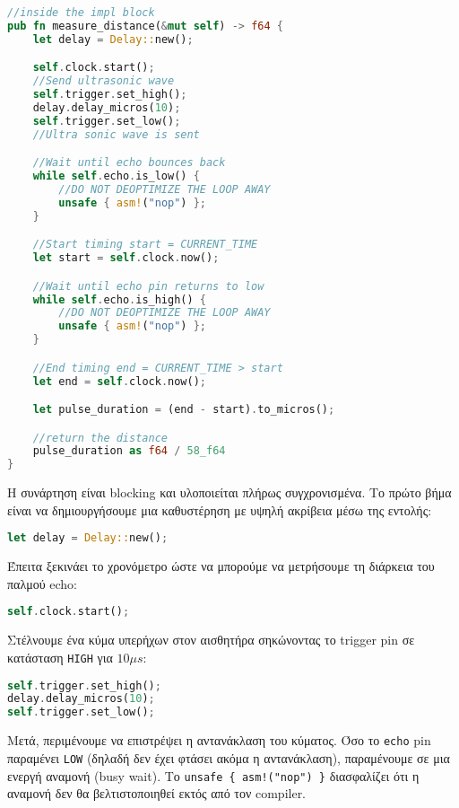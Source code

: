 \begin{lstlisting}[language=Rust]
//inside the impl block
pub fn measure_distance(&mut self) -> f64 {
    let delay = Delay::new();

    self.clock.start();
    //Send ultrasonic wave
    self.trigger.set_high();
    delay.delay_micros(10);
    self.trigger.set_low();
    //Ultra sonic wave is sent

    //Wait until echo bounces back
    while self.echo.is_low() {
        //DO NOT DEOPTIMIZE THE LOOP AWAY
        unsafe { asm!("nop") };
    }

    //Start timing start = CURRENT_TIME
    let start = self.clock.now();

    //Wait until echo pin returns to low
    while self.echo.is_high() {
        //DO NOT DEOPTIMIZE THE LOOP AWAY
        unsafe { asm!("nop") };
    }

    //End timing end = CURRENT_TIME > start
    let end = self.clock.now();

    let pulse_duration = (end - start).to_micros();

    //return the distance
    pulse_duration as f64 / 58_f64
}
\end{lstlisting}

Η συνάρτηση είναι blocking και υλοποιείται πλήρως συγχρονισμένα. 
Το πρώτο βήμα είναι να δημιουργήσουμε μια καθυστέρηση με υψηλή ακρίβεια μέσω της εντολής:

\begin{lstlisting}[language=Rust]
let delay = Delay::new();
\end{lstlisting}

Έπειτα ξεκινάει το χρονόμετρο ώστε να μπορούμε να μετρήσουμε τη διάρκεια του παλμού echo:

\begin{lstlisting}[language=Rust]
self.clock.start();
\end{lstlisting}

Στέλνουμε ένα κύμα υπερήχων στον αισθητήρα σηκώνοντας το trigger pin σε κατάσταση \verb|HIGH| για $10\mu s$:

\begin{lstlisting}[language=Rust]
self.trigger.set_high();
delay.delay_micros(10);
self.trigger.set_low();
\end{lstlisting}

Μετά, περιμένουμε να επιστρέψει η αντανάκλαση του κύματος. Όσο το
\verb|echo| pin παραμένει \verb|LOW| (δηλαδή δεν έχει φτάσει ακόμα η
αντανάκλαση), παραμένουμε σε μια ενεργή αναμονή (busy wait). Το
\verb|unsafe { asm!("nop") }| διασφαλίζει ότι η αναμονή δεν θα
βελτιστοποιηθεί εκτός από τον compiler.

